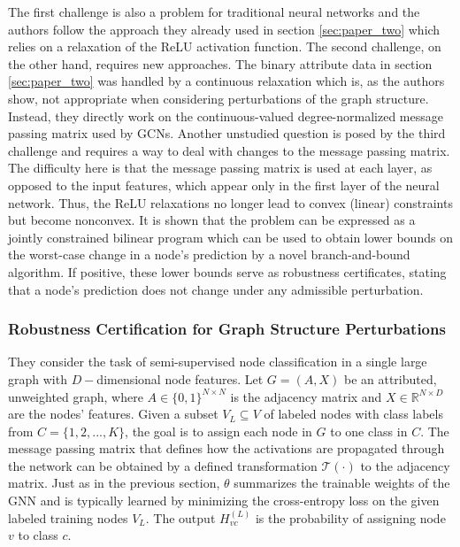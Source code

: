 \documentclass[a4paper,preprint]{sig-alternate}
\begin{document}
The first challenge is also a problem for traditional neural networks and the authors follow the approach they already used
in section \ref{sec:paper_two} which relies on a relaxation of the ReLU activation function.
The second challenge, on the other hand, requires new approaches. 
The binary attribute data in section \ref{sec:paper_two} was handled by a continuous relaxation which is, as the authors show,
not appropriate when considering perturbations of the graph structure. Instead, they directly work on the 
continuous-valued degree-normalized message passing matrix used by GCNs.
Another unstudied question is posed by the third challenge and requires a way to deal with changes to the message passing matrix.
The difficulty here is that the message passing matrix is used at each layer, as opposed to the input features,
which appear only in the first layer of the neural network. Thus, the ReLU relaxations no longer lead to convex (linear)
constraints but become nonconvex. It is shown that the problem can be expressed as a jointly constrained bilinear program
which can be used to obtain lower bounds on the worst-case change in a node's prediction by a novel branch-and-bound algorithm.
If positive, these lower bounds serve as robustness certificates, stating that a node's prediction does not change under any 
admissible perturbation.

\subsubsection{Robustness Certification for Graph Structure Perturbations}

They consider the task of semi-supervised node classification in a single large graph with $D-$dimensional
node features. Let $G = (A, X)$ be an attributed, unweighted graph, where $A \in \{0, 1\}^{N \times N}$ is the
adjacency matrix and $X \in \mathbb{R}^{N \times D}$ are the nodes' features. Given a subset $V_L \subseteq V$ of 
labeled nodes with class labels from $C = \{1, 2, ..., K\}$, the goal is to assign each node in $G$ to one class in $C$.
The message passing matrix that defines how the activations are propagated through the network can be obtained
by a defined transformation $\mathcal{T}(\cdot)$ to the adjacency matrix. Just as in the previous section, $\theta$ summarizes the trainable weights of 
the GNN and is typically learned by minimizing the cross-entropy loss on the given labeled training nodes $V_L$. The output 
$H_{vc}^{(L)}$ is the probability of assigning node $v$ to class $c$.\newline
\end{document}
